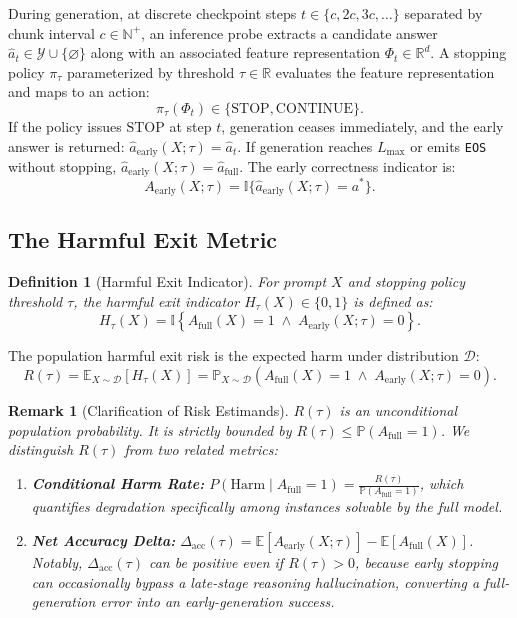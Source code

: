 \documentclass[11pt]{article}
\newtheorem{definition}{Definition}
\newtheorem{remark}{Remark}
\newcommand{\Prb}{\mathbb{P}}
\newcommand{\E}{\mathbb{E}}
\newcommand{\I}{\mathbb{I}}
\newcommand{\calD}{\mathcal{D}}
\newcommand{\calY}{\mathcal{Y}}
\begin{document}
During generation, at discrete checkpoint steps $t \in \{c, 2c, 3c, \dots\}$ separated by chunk interval $c \in \mathbb{N}^+$, an inference probe extracts a candidate answer $\hat{a}_t \in \calY \cup \{\varnothing\}$ along with an associated feature representation $\Phi_t \in \mathbb{R}^d$. A stopping policy $\pi_\tau$ parameterized by threshold $\tau \in \mathbb{R}$ evaluates the feature representation and maps to an action:
\begin{equation}
  \pi_\tau(\Phi_t) \in \{\mathrm{STOP}, \mathrm{CONTINUE}\}.
\end{equation}
If the policy issues $\mathrm{STOP}$ at step $t$, generation ceases immediately, and the early answer is returned: $\hat{a}_{\mathrm{early}}(X; \tau) = \hat{a}_t$. If generation reaches $L_{\max}$ or emits \texttt{EOS} without stopping, $\hat{a}_{\mathrm{early}}(X; \tau) = \hat{a}_{\mathrm{full}}$. The early correctness indicator is:
\begin{equation}
  A_{\mathrm{early}}(X; \tau) = \I\{\hat{a}_{\mathrm{early}}(X; \tau) = a^*\}.
\end{equation}

\subsection{The Harmful Exit Metric}
\begin{definition}[Harmful Exit Indicator]
For prompt $X$ and stopping policy threshold $\tau$, the harmful exit indicator $H_\tau(X) \in \{0, 1\}$ is defined as:
\begin{equation}
  H_\tau(X) = \I\left\{A_{\mathrm{full}}(X) = 1 \;\land\; A_{\mathrm{early}}(X; \tau) = 0\right\}.
\end{equation}
\end{definition}

The population harmful exit risk is the expected harm under distribution $\calD$:
\begin{equation}
  R(\tau) = \E_{X \sim \calD}\left[H_\tau(X)\right] = \Prb_{X \sim \calD}\left(A_{\mathrm{full}}(X) = 1 \;\land\; A_{\mathrm{early}}(X; \tau) = 0\right).
\end{equation}

\begin{remark}[Clarification of Risk Estimands]
$R(\tau)$ is an unconditional population probability. It is strictly bounded by $R(\tau) \le \Prb(A_{\mathrm{full}}=1)$. We distinguish $R(\tau)$ from two related metrics:
\begin{enumerate}
  \item \textbf{Conditional Harm Rate:} $P(\mathrm{Harm} \mid A_{\mathrm{full}}=1) = \frac{R(\tau)}{\Prb(A_{\mathrm{full}}=1)}$, which quantifies degradation specifically among instances solvable by the full model.
  \item \textbf{Net Accuracy Delta:} $\Delta_{\mathrm{acc}}(\tau) = \E[A_{\mathrm{early}}(X; \tau)] - \E[A_{\mathrm{full}}(X)]$. Notably, $\Delta_{\mathrm{acc}}(\tau)$ can be positive even if $R(\tau) > 0$, because early stopping can occasionally bypass a late-stage reasoning hallucination, converting a full-generation error into an early-generation success.
\end{enumerate}
\end{remark}
\end{document}
